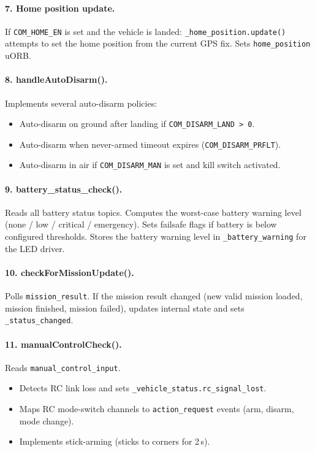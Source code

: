 \documentclass[12pt,a4paper]{article}
\begin{document}
\paragraph{7. Home position update.}
If \texttt{COM\_HOME\_EN} is set and the vehicle is landed:
\texttt{\_home\_position.update()} attempts to set the home position from the
current GPS fix. Sets \texttt{home\_position} uORB.

\paragraph{8. handleAutoDisarm().}
Implements several auto-disarm policies:
\begin{itemize}
  \item Auto-disarm on ground after landing if \texttt{COM\_DISARM\_LAND > 0}.
  \item Auto-disarm when never-armed timeout expires (\texttt{COM\_DISARM\_PRFLT}).
  \item Auto-disarm in air if \texttt{COM\_DISARM\_MAN} is set and kill switch activated.
\end{itemize}

\paragraph{9. battery\_status\_check().}
Reads all battery status topics.
Computes the worst-case battery warning level (none / low / critical / emergency).
Sets failsafe flags if battery is below configured thresholds.
Stores the battery warning level in \texttt{\_battery\_warning} for the LED driver.

\paragraph{10. checkForMissionUpdate().}
Polls \texttt{mission\_result}. If the mission result changed (new valid mission
loaded, mission finished, mission failed), updates internal state and
sets \texttt{\_status\_changed}.

\paragraph{11. manualControlCheck().}
Reads \texttt{manual\_control\_input}.
\begin{itemize}
  \item Detects RC link loss and sets \texttt{\_vehicle\_status.rc\_signal\_lost}.
  \item Maps RC mode-switch channels to \texttt{action\_request} events
        (arm, disarm, mode change).
  \item Implements stick-arming (sticks to corners for 2\,s).
\end{itemize}
\end{document}
